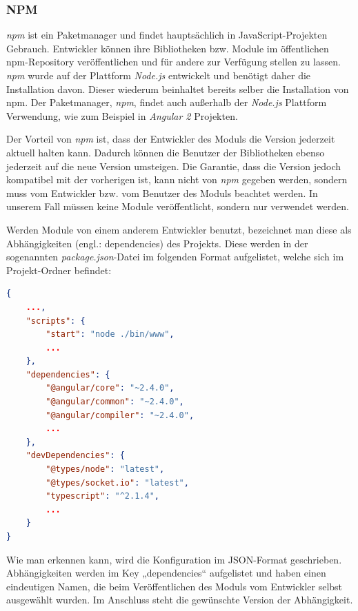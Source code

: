 \subsubsection{NPM}
\textit{npm} ist ein Paketmanager und findet hauptsächlich in JavaScript-Projekten Gebrauch. Entwickler können ihre Bibliotheken bzw. Module im öffentlichen npm-Repository veröffentlichen und für andere zur Verfügung stellen zu lassen. \textit{npm} wurde auf der Plattform \textit{Node.js} entwickelt und benötigt daher die Installation davon. Dieser wiederum beinhaltet bereits selber die Installation von npm.
Der Paketmanager, \textit{npm}, findet auch außerhalb der \textit{Node.js} Plattform Verwendung, wie zum Beispiel in \textit{Angular 2} Projekten.

Der Vorteil von \textit{npm} ist, dass der Entwickler des Moduls die Version jederzeit aktuell halten kann. Dadurch können die Benutzer der Bibliotheken ebenso jederzeit auf die neue Version umsteigen. Die Garantie, dass die Version jedoch kompatibel mit der vorherigen ist, kann nicht von \textit{npm} gegeben werden, sondern muss vom Entwickler bzw. vom Benutzer des Moduls beachtet werden. In unserem Fall müssen keine Module veröffentlicht, sondern nur verwendet werden.

Werden Module von einem anderem Entwickler benutzt, bezeichnet man diese als Abhängigkeiten (engl.: dependencies) des Projekts. Diese werden in der sogenannten \textit{package.json}-Datei im folgenden Format aufgelistet, welche sich im Projekt-Ordner befindet:

\lstset{escapechar=?,style=customjava}
\begin{lstlisting}[language=json, caption=Beispiel einer package.json-Datei]
{
    ...,
    "scripts": {
        "start": "node ./bin/www",
        ...
    },
    "dependencies": {
        "@angular/core": "~2.4.0",
        "@angular/common": "~2.4.0",
        "@angular/compiler": "~2.4.0",
        ...
    },
    "devDependencies": {
        "@types/node": "latest",
        "@types/socket.io": "latest",
        "typescript": "^2.1.4",
        ...
    }
}
\end{lstlisting}
\lstset{escapechar=@,style=customjava}

Wie man erkennen kann, wird die Konfiguration im JSON-Format geschrieben. Abhängigkeiten werden im Key „dependencies“ aufgelistet und haben einen eindeutigen Namen, die beim Veröffentlichen des Moduls vom Entwickler selbst ausgewählt wurden. Im Anschluss steht die gewünschte Version der Abhängigkeit.

